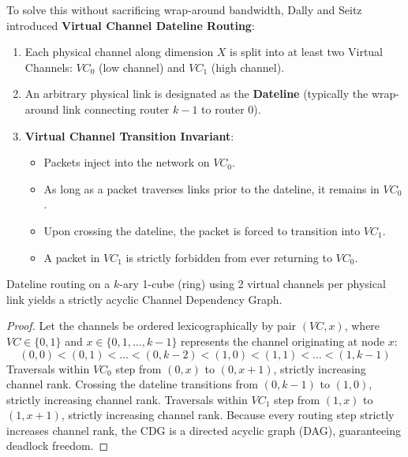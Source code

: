 To solve this without sacrificing wrap-around bandwidth, Dally and Seitz~\cite{Dally1987} introduced \textbf{Virtual Channel Dateline Routing}:
\begin{enumerate}
    \item Each physical channel along dimension $X$ is split into at least two Virtual Channels: $VC_0$ (low channel) and $VC_1$ (high channel).
    \item An arbitrary physical link is designated as the \textbf{Dateline} (typically the wrap-around link connecting router $k-1$ to router $0$).
    \item \textbf{Virtual Channel Transition Invariant}:
    \begin{itemize}
        \item Packets inject into the network on $VC_0$.
        \item As long as a packet traverses links prior to the dateline, it remains in $VC_0$.
        \item Upon crossing the dateline, the packet is forced to transition into $VC_1$.
        \item A packet in $VC_1$ is strictly forbidden from ever returning to $VC_0$.
    \end{itemize}
\end{enumerate}

\begin{theorem}
Dateline routing on a $k$-ary 1-cube (ring) using 2 virtual channels per physical link yields a strictly acyclic Channel Dependency Graph.
\end{theorem}

\begin{proof}
Let the channels be ordered lexicographically by pair $(VC, x)$, where $VC \in \{0, 1\}$ and $x \in \{0, 1, \dots, k-1\}$ represents the channel originating at node $x$:
\begin{equation}
(0, 0) < (0, 1) < \dots < (0, k-2) < (1, 0) < (1, 1) < \dots < (1, k-1)
\end{equation}
Traversals within $VC_0$ step from $(0, x)$ to $(0, x+1)$, strictly increasing channel rank. Crossing the dateline transitions from $(0, k-1)$ to $(1, 0)$, strictly increasing channel rank. Traversals within $VC_1$ step from $(1, x)$ to $(1, x+1)$, strictly increasing channel rank. Because every routing step strictly increases channel rank, the CDG is a directed acyclic graph (DAG), guaranteeing deadlock freedom.
\end{proof}

